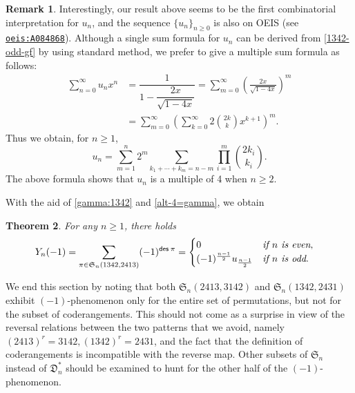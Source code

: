 \documentclass[12pt,reqno]{amsart}
\numberwithin{equation}{section}
\theoremstyle{plain}
\newtheorem{theorem}{Theorem}[section]
\theoremstyle{definition}
\newtheorem{remark}[theorem]{Remark}
\def\S{\mathfrak{S}}
\def\D{\mathfrak{D}}
\def\des{\mathsf{des}}
\begin{document}
\begin{remark}
Interestingly, our result above seems to be the first combinatorial interpretation for $u_n$, and the sequence $\{u_n\}_{n\ge 0}$ is also on OEIS (see \href{https://oeis.org/A084868}{\tt{oeis:A084868}}).
Although a single sum formula for  $u_n$ can be derived from  \eqref{1342-odd-gf}
by using standard method, we prefer to give  a multiple sum formula  as follows:
\begin{align*}
\sum_{n=0}^{\infty}u_n x^n&=\dfrac{1}{1-\dfrac{2x}{\sqrt{1-4x}}}
=\sum_{m=0}^{\infty} \left(\frac{2x}{\sqrt{1-4x}}\right)^m\\
&=\sum_{m=0}^{\infty} \left(\sum_{k=0}^{\infty} 2\binom{2k}{k} x^{k+1}\right)^m.
\end{align*}
Thus we obtain, for $n\geq 1$,
\begin{equation}\label{sum formula}
u_n=\sum_{m=1}^n 2^m \sum_{k_1+\cdots +k_m=n-m}\prod_{i=1}^m \binom{2k_i}{k_i}.
\end{equation}
The above formula shows that  $u_{n}$ is a multiple of 4 when $n\geq 2$.
\end{remark}

With the aid of \eqref{gamma:1342} and \eqref{alt-4=gamma}, we obtain
\begin{theorem}
For any $n\ge 1$, there holds
\begin{align}
\label{alt:1342}
Y_{n}(-1)=\sum_{\pi\in\S_n(1342,2413)}(-1)^{\des\:\pi}&=\begin{cases}0 & \emph{if $n$ is even},\\
(-1)^{\frac{n-1}{2}}u_{\frac{n-1}{2}} & \emph{if $n$ is odd}.
\end{cases}
\end{align}
\end{theorem}

We end this section by noting that both $\S_n(2413,3142)$ and $\S_n(1342,2431)$ exhibit $(-1)$-phenomenon only for the entire set of permutations, but not for the subset of coderangements. This should not come as a surprise in view of the reversal relations between the two patterns that we avoid, namely $(2413)^r=3142, (1342)^r=2431$, and the fact that the definition of coderangements is incompatible with the reverse map. Other subsets of $\S_n$ instead of $\D^*_n$ should be examined to hunt for the other half of the $(-1)$-phenomenon.
\end{document}
